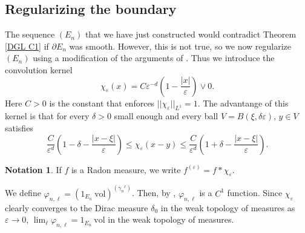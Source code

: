 \documentclass[reqno,12pt,letterpaper]{amsart}
\newcommand{\vol}{\mathrm{vol}}
\theoremstyle{definition}
\newtheorem{notation}[theorem]{Notation}
\numberwithin{equation}{section}
\begin{document}
\subsection{Regularizing the boundary}
The sequence $(E_n)$ that we have just constructed would contradict Theorem \ref{DGL C1} if $\partial E_n$ was smooth.
However, this is not true, so we now regularize $(E_n)$ using a modification of the arguments of \cite[Chapter 7]{Giusti77}.
Thus we introduce the convolution kernel
$$\chi_\varepsilon(x) = C \varepsilon^{-d}\left(1 - \frac{|x|}{\varepsilon}\right) \vee 0.$$
Here $C > 0$ is the constant that enforces $||\chi_\varepsilon||_{L^1} = 1$.
The advantange of this kernel is that for every $\delta > 0$ small enough and every ball $V = B(\xi, \delta\varepsilon)$, $y \in V$ satisfies
\begin{equation}\label{kernel on balls}
\frac{C}{\varepsilon^d}\left(1 - \delta - \frac{|x - \xi|}{\varepsilon}\right) \leq \chi_\varepsilon(x - y) \leq \frac{C}{\varepsilon^d}\left(1 + \delta - \frac{|x - \xi|}{\varepsilon}\right).
\end{equation}

\begin{notation}
If $f$ is a Radon measure, we write $f^{(\varepsilon)} = f * \chi_\varepsilon$.
\end{notation}

We define $\varphi_{n, \ell} = (1_{E_n} ~\vol)^{({\gamma_n}^\ell)}$.
Then, by \cite[Lemma 7.1]{Giusti77}, $\varphi_{n, \ell}$ is a $C^1$ function.
Since $\chi_\varepsilon$ clearly converges to the Dirac measure $\delta_0$ in the weak topology of measures as $\varepsilon \to 0$, $\lim_\ell \varphi_{n, \ell} = 1_{E_n} ~\vol$ in the weak topology of measures.
\end{document}
